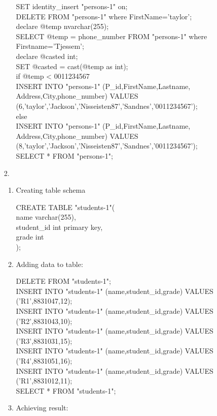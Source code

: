 \documentclass{article}
\begin{document}
\begin{enumerate}
\begin{enumerate}
                SET identity\_insert "persons-1" on;\\
                DELETE FROM "persons-1" where FirstName='taylor';\\
                declare @temp nvarchar(255);\\
                SELECT @temp = phone\_number FROM "persons-1" where Firstname='Tjessem';\\
                declare @casted int;\\
                SET @casted = cast(@temp as int);\\
                if @temp < 0011234567\\
                INSERT INTO "persons-1" (P\_id,FirstName,Lastname, Address,City,phone\_number) VALUES (6,'taylor','Jackson','Nisseisten87','Sandnes','0011234567');\\
                else\\
                INSERT INTO "persons-1" (P\_id,FirstName,Lastname, Address,City,phone\_number) VALUES (8,'taylor','Jackson','Nisseisten87','Sandnes','0011234567');\\
                SELECT * FROM "persons-1";\\
        \end{enumerate}
    \item[2.]
        \begin{enumerate}
            \item Creating table schema

                CREATE TABLE "students-1"(\\
                name varchar(255),\\
                student\_id int primary key,\\
                grade int\\
                );\\
            \item Adding data to table:

                DELETE FROM "students-1";\\
                INSERT INTO "students-1" (name,student\_id,grade) VALUES ('R1',8831047,12);\\
                INSERT INTO "students-1" (name,student\_id,grade) VALUES ('R2',8831043,10);\\
                INSERT INTO "students-1" (name,student\_id,grade) VALUES ('R3',8831031,15);\\
                INSERT INTO "students-1" (name,student\_id,grade) VALUES ('R4',8831051,16);\\
                INSERT INTO "students-1" (name,student\_id,grade) VALUES ('R1',8831012,11);\\
                SELECT * FROM "students-1";\\
            \item Achieving result:


\end{enumerate}
\end{enumerate}
\end{document}
